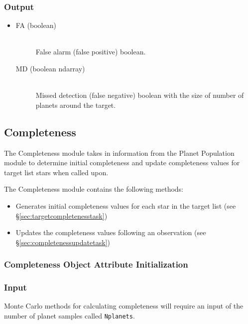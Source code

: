 \documentclass[cleanfoot]{asme2ej}
\begin{document}
\subsubsection*{Output}
\begin{itemize}
\item 
\begin{description}
    \item[FA (boolean)] \hfill \\ False alarm (false positive) boolean.
    \item[MD (boolean ndarray)] \hfill \\ Missed detection (false negative) boolean with the size of number of planets around the target.
\end{description}
\end{itemize}



\subsection{Completeness}\label{sec:completeness}
The Completeness module takes in information from the Planet Population module to determine initial completeness and update completeness values for target list stars when called upon.

The Completeness module contains the following methods:
\begin{itemize}[leftmargin=2in,font={\ttfamily}]
    \item[\texttt target\_completeness] Generates initial completeness values for each star in the target list (see \S\ref{sec:targetcompletenesstask})
    \item[\texttt completeness\_update] Updates the completeness values following an observation (see \S\ref{sec:completenessupdatetask})
\end{itemize}

\subsubsection{Completeness Object Attribute Initialization}

\subsubsection*{Input}
Monte Carlo methods for calculating completeness will require an input of the number of planet samples called \verb+Nplanets+. 
\end{document}
